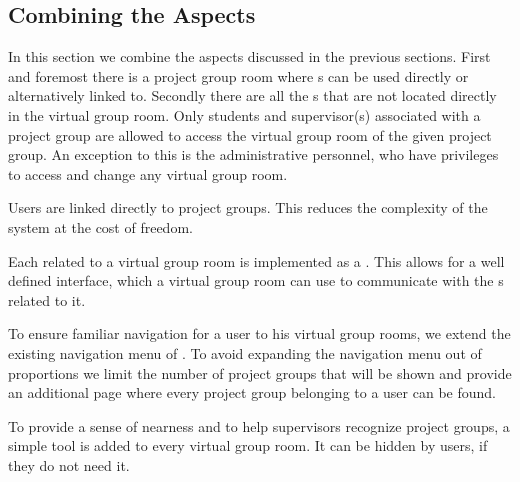 \subsection{Combining the Aspects}
In this section we combine the aspects discussed in the previous sections.
First and foremost there is a project group room where \detdeandrelaver[]s can be used directly or alternatively linked to.
Secondly there are all the \detdeandrelaver[]s that are not located directly in the virtual group room.
Only students and supervisor(s) associated with a project group are allowed to access the virtual group room of the given project group.
An exception to this is the administrative personnel, who have privileges to access and change any virtual group room.

Users are linked directly to project groups.
This reduces the complexity of the system at the cost of freedom.

Each \detdeandrelaver{} related to a virtual group room is implemented as a \block{}.
This allows for a well defined interface, which a virtual group room can use to communicate with the \detdeandrelaver[]s related to it.

To ensure familiar navigation for a user to his virtual group rooms, we extend the existing navigation menu of \moodle{}.
To avoid expanding the navigation menu out of proportions we limit the number of project groups that will be shown and provide an additional page where every project group belonging to a user can be found.

To provide a sense of nearness and to help supervisors recognize project groups, a simple tool is added to every virtual group room.
It can be hidden by users, if they do not need it.













\FloatBarrier